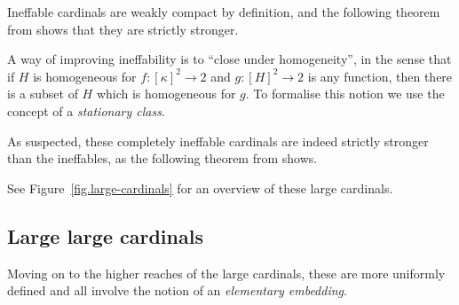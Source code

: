 \documentclass[../../main]{subfiles}
\begin{document}
Ineffable cardinals are weakly compact by definition, and the following theorem from \cite{Friedman} shows that they are strictly stronger.


A way of improving ineffability is to ``close under homogeneity'', in the sense that if $H$ is homogeneous for $f\colon[\kappa]^2\to 2$ and $g\colon[H]^2\to 2$ is any function, then there is a subset of $H$ which is homogeneous for $g$. To formalise this notion we use the concept of a \textit{stationary class}.



As suspected, these completely ineffable cardinals are indeed strictly stronger than the ineffables, as the following theorem from \cite{Abramson} shows.


See Figure~\ref{fig.large-cardinals} for an overview of these large cardinals.

\subsection{Large large cardinals}

Moving on to the higher reaches of the large cardinals, these are more uniformly defined and all involve the notion of an \textit{elementary embedding}.

\end{document}
